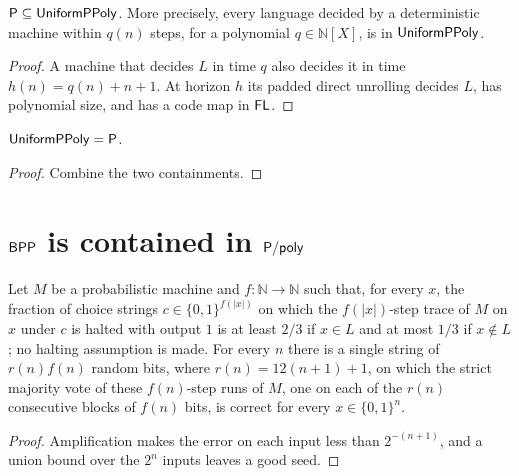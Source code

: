 \begin{theorem}
  \label{thm:circuits-p-subset-uniform}
  \leanok
  $\mathsf{P} \subseteq \mathsf{UniformPPoly}$. More precisely, every language decided
  by a deterministic machine within $q(n)$ steps, for a polynomial
  $q \in \mathbb{N}[X]$, is in $\mathsf{UniformPPoly}$.
\end{theorem}
\begin{proof}
  \leanok
  A machine that decides $L$ in time $q$ also decides it in time
  $h(n) = q(n) + n + 1$. At horizon $h$ its padded direct unrolling decides
  $L$, has polynomial size, and has a code map in $\mathsf{FL}$.
\end{proof}

\begin{theorem}
  \label{thm:circuits-uniform-eq-p}
  \leanok
  $\mathsf{UniformPPoly} = \mathsf{P}$.
\end{theorem}
\begin{proof}
  \leanok
  Combine the two containments.
\end{proof}

\section{$\mathsf{BPP}$ is contained in $\mathsf{P/poly}$}
\label{sec:circuits-bpp}

\begin{lemma}
  \label{lem:circuits-uniform-seed}
  \leanok
  Let $M$ be a probabilistic machine and $f : \mathbb{N} \to \mathbb{N}$ such
  that, for every $x$, the fraction of choice strings $c \in \{0,1\}^{f(|x|)}$
  on which the $f(|x|)$-step trace of $M$ on $x$ under $c$ is halted with
  output $1$ is at least $2/3$ if $x \in L$ and at most $1/3$ if
  $x \notin L$; no halting assumption is made. For every $n$ there is a
  single string of $r(n) f(n)$ random bits, where $r(n) = 12(n + 1) + 1$, on
  which the strict majority vote of these $f(n)$-step runs of $M$, one on each
  of the $r(n)$ consecutive blocks of $f(n)$ bits, is correct for every
  $x \in \{0,1\}^n$.
\end{lemma}
\begin{proof}
  \leanok
  Amplification makes the error on each input less than $2^{-(n+1)}$, and a
  union bound over the $2^n$ inputs leaves a good seed.
\end{proof}

